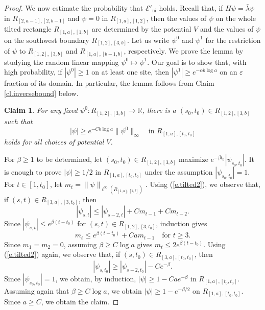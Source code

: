 \documentclass{amsart}
\newtheorem{claim}[equation]{Claim}
\newcommand{\eref}[1]{(\ref{e.#1})}
\newcommand{\clref}[1]{Claim \ref{cl.#1}}
\numberwithin{equation}{section}
\numberwithin{figure}{section}
\newcommand{\R}{\mathbb{R}}
\newcommand{\ep}{\varepsilon}
\begin{document}
\begin{proof}
We now estimate the probability that $\mathcal E'_{\mathrm{ni}}$ holds.  Recall that, if $H \psi = \bar \lambda \psi$ in $R_{[2,a-1],[2,b-1]}$ and $\psi = 0$ in $R_{[1,a],[1,2]}$, then the values of $\psi$ on the whole tilted rectangle $R_{[1,a],[1,b]}$ are determined by the potential $V$ and the values of $\psi$ on the southwest boundary $R_{[1,2],[3,b]}$.  Let us write $\psi^0$ and $\psi^1$ for the restriction of $\psi$ to $R_{[1,2],[3,b]}$ and $R_{[1,a],[b-1,b]}$, respectively.  We prove the lemma by studying the random linear mapping $\psi^0 \mapsto \psi^1$.  Our goal is to show that, with high probability, if $|\psi^0| \geq 1$ on at least one site, then $|\psi^1| \geq e^{- \alpha b \log a}$ on an $\ep$ fraction of its domain.  In particular, the lemma follows from \clref{inversebound} below.

\begin{claim}
For any fixed $\psi^0 : R_{[1,2],[3,b]} \to \R$, there is a $(s_0,t_0) \in R_{[1,2],[3,b]}$ such that
\begin{equation*}
|\psi| \geq e^{-C b \log a} \| \psi^0 \|_\infty \quad \mbox{in } R_{[1,a],[t_0,t_0]}
\end{equation*}
holds for all choices of potential $V$.
\end{claim}

For $\beta \geq 1$ to be determined, let $(s_0,t_0) \in R_{[1,2],[3,b]}$ maximize $e^{-\beta t_0} |\psi_{s_0,t_0}|$.  It is enough to prove $|\psi| \geq 1/2$ in $R_{[1,a],[t_0,t_0]}$ under the assumption $|\psi_{s_0,t_0}| = 1$.  For $t \in [1,t_0]$, let $m_t = \| \psi \|_{\ell^\infty(R_{[1,a],[1,t]})}$.  Using \eref{tilted2}, we observe that, if $(s,t) \in R_{[3,a],[3,t_0]}$, then
\begin{equation*}
|\psi_{s,t}| \leq |\psi_{s-2,t}| + C m_{t-1} + C m_{t-2}.
\end{equation*}
Since $|\psi_{s,t}| \leq e^{\beta (t - t_0)}$ for $(s,t) \in R_{[1,2],[3,t_0]}$, induction gives
\begin{equation*}
m_t \leq e^{\beta (t-t_0)} + C a m_{t-1} \quad \mbox{for } t \geq 3.
\end{equation*}
Since $m_1 = m_2 = 0$, assuming $\beta \geq C \log a$ gives $m_t \leq 2 e^{\beta (t - t_0)}$.  Using \eref{tilted2} again, we observe that, if $(s,t_0) \in R_{[3,a],[t_0,t_0]}$, then
\begin{equation*}
|\psi_{s,t_0}| \geq |\psi_{s-2,t_0}| - C e^{-\beta}.
\end{equation*}
Since $|\psi_{s_0,t_0}| = 1$, we obtain, by induction, $|\psi| \geq 1 - C a e^{-\beta}$ in $R_{[1,a],[t_0,t_0]}$.   Assuming again that $\beta \geq C \log a$, we obtain $|\psi| \geq 1 - e^{-\beta/2}$ on $R_{[1,a],[t_0,t_0]}$.  Since $a \geq C$, we obtain the claim.


\end{proof}
\end{document}
